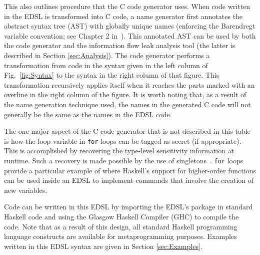 \documentclass[10pt, conference]{IEEEtran}
\newcommand{\ttt}{\texttt}
\begin{document}
This also outlines procedure that the C code generator uses. When code written
in the EDSL is transformed into C code, a name generator first annotates the
abstract syntax tree (AST) with globally unique names (enforcing the Barendregt
variable convention; see Chapter 2 in~\cite{BarendregtConversion}). This
annotated AST can be used by both the code generator and the information flow
leak analysis tool (the latter is described in Section \ref{sec:Analysis}). The
code generator performs a transformation from code in the syntax given in the
left column of Fig.~\ref{fig:Syntax} to the syntax in the right column of that figure. This
transformation recursively applies itself when it reaches the parts marked with
an overline in the right column of the figure. It is worth noting that, as a
result of the name generation technique used, the names in the generated C code will not generally
be the same as the names in the EDSL code.

The one major aspect of the C code generator that is not described in this table
is how the loop variable in \ttt{for} loops can be tagged as secret (if appropriate).
This is accomplished by recovering the type-level sensitivity information at
runtime. Such a recovery is made possible by the use of singletons~\cite{Singletons}.
\ttt{for} loops provide a particular example of where Haskell's support for higher-order functions
can be used inside an EDSL to implement commands that involve the creation of
new variables.

Code can be written in this EDSL by importing the EDSL's package in standard
Haskell code and using the Glasgow Haskell Compiler (GHC) to compile the code.
Note that as a result of this design, all standard Haskell programming language
constructs are available for metaprogramming purposes.  Examples written in this
EDSL syntax are given in Section \ref{sec:Examples}.
\end{document}
